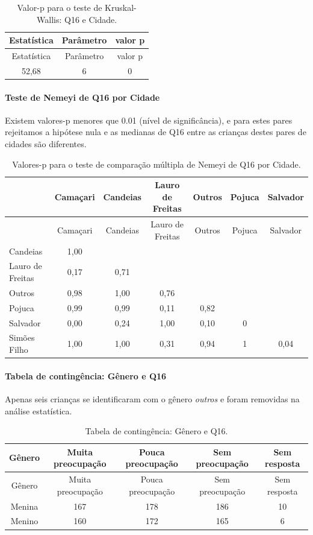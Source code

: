 \documentclass[]{article}
\let\oldparagraph\paragraph
\renewcommand{\paragraph}[1]{\oldparagraph{#1}\mbox{}}
\begin{document}
\begin{longtable}[]{@{}ccc@{}}
\caption{\label{tab:unnamed-chunk-138}Valor-p para o teste de Kruskal-Wallis: Q16 e Cidade.}\tabularnewline
\toprule
Estatística & Parâmetro & valor p\tabularnewline
\midrule
\endfirsthead
\toprule
Estatística & Parâmetro & valor p\tabularnewline
\midrule
\endhead
52,68 & 6 & 0\tabularnewline
\bottomrule
\end{longtable}

\hypertarget{teste-de-nemeyi-de-q16-por-cidade}{%
\paragraph{Teste de Nemeyi de Q16 por Cidade}\label{teste-de-nemeyi-de-q16-por-cidade}}

Existem valores-p menores que 0.01 (nível de significância), e para estes pares rejeitamos a hipótese nula e as medianas de Q16 entre as crianças destes pares de cidades são diferentes.

\begin{longtable}[]{@{}lcccccc@{}}
\caption{\label{tab:unnamed-chunk-140}Valores-p para o teste de comparação múltipla de Nemeyi de Q16 por Cidade.}\tabularnewline
\toprule
& Camaçari & Candeias & Lauro de Freitas & Outros & Pojuca & Salvador\tabularnewline
\midrule
\endfirsthead
\toprule
& Camaçari & Candeias & Lauro de Freitas & Outros & Pojuca & Salvador\tabularnewline
\midrule
\endhead
Candeias & 1,00 & & & & &\tabularnewline
Lauro de Freitas & 0,17 & 0,71 & & & &\tabularnewline
Outros & 0,98 & 1,00 & 0,76 & & &\tabularnewline
Pojuca & 0,99 & 0,99 & 0,11 & 0,82 & &\tabularnewline
Salvador & 0,00 & 0,24 & 1,00 & 0,10 & 0 &\tabularnewline
Simões Filho & 1,00 & 1,00 & 0,31 & 0,94 & 1 & 0,04\tabularnewline
\bottomrule
\end{longtable}

\cleardoublepage

\hypertarget{tabela-de-continguxeancia-guxeanero-e-q16}{%
\paragraph{Tabela de contingência: Gênero e Q16}\label{tabela-de-continguxeancia-guxeanero-e-q16}}

Apenas seis crianças se identificaram com o gênero \emph{outros} e foram removidas na análise estatística.

\begin{longtable}[]{@{}ccccc@{}}
\caption{\label{tab:unnamed-chunk-141}Tabela de contingência: Gênero e Q16.}\tabularnewline
\toprule
Gênero & Muita preocupação & Pouca preocupação & Sem preocupação & Sem resposta\tabularnewline
\midrule
\endfirsthead
\toprule
Gênero & Muita preocupação & Pouca preocupação & Sem preocupação & Sem resposta\tabularnewline
\midrule
\endhead
Menina & 167 & 178 & 186 & 10\tabularnewline
Menino & 160 & 172 & 165 & 6\tabularnewline
\bottomrule
\end{longtable}
\end{document}
